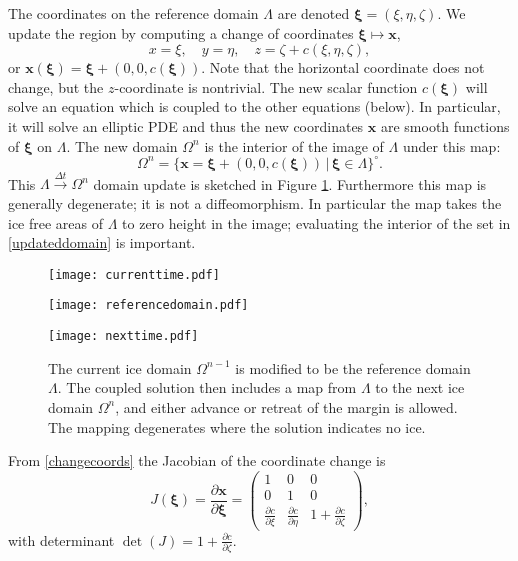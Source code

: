 \documentclass[letterpaper,final,12pt,reqno]{amsart}
\newcommand{\bx}{\mathbf{x}}
\newcommand{\bxi}{\bm{\xi}}
\begin{document}
The coordinates on the reference domain $\Lambda$ are denoted $\bxi=(\xi,\eta,\zeta)$.  We update the region by computing a change of coordinates $\bxi \mapsto \bx$,
\begin{equation}
x=\xi, \quad y=\eta, \quad z=\zeta+c(\xi,\eta,\zeta), \label{changecoords}
\end{equation}
or $\bx(\bxi) = \bxi + (0,0,c(\bxi))$.  Note that the horizontal coordinate does not change, but the $z$-coordinate is nontrivial.  The new scalar function $c(\bxi)$ will solve an equation which is coupled to the other equations (below).  In particular, it will solve an elliptic PDE and thus the new coordinates $\bx$ are smooth functions of $\bxi$ on $\Lambda$.  The new domain $\Omega^n$ is the interior of the image of $\Lambda$ under this map:
\begin{equation}
\Omega^n = \{\bx=\bxi + (0,0,c(\bxi)) \,\big|\, \bxi \in \Lambda\}^\circ. \label{updateddomain}
\end{equation}
This $\Lambda \stackrel{\Delta t}{\to} \Omega^n$ domain update is sketched in Figure \ref{fig:domainupdate}.  Furthermore this map is generally degenerate; it is not a diffeomorphism.  In particular the map takes the ice free areas of $\Lambda$ to zero height in the image; evaluating the interior of the set in \eqref{updateddomain} is important.

\begin{figure}[h]
\begin{center}
\texttt{[image: currenttime.pdf]}
\vspace{-3mm}

\texttt{[image: referencedomain.pdf]}

\texttt{[image: nexttime.pdf]}
\end{center}
\caption{The current ice domain $\Omega^{n-1}$ is modified to be the reference domain $\Lambda$.  The coupled solution then includes a map from $\Lambda$ to the next ice domain $\Omega^n$, and either advance or retreat of the margin is allowed.  The mapping degenerates where the solution indicates no ice.}
\label{fig:domainupdate}
\end{figure}

From \eqref{changecoords} the Jacobian of the coordinate change is
\begin{equation}
J(\bxi) = \frac{\partial \bx}{\partial \bm{\xi}} = \begin{pmatrix} 1 & 0 & 0 \\  0 & 1 & 0 \\ \frac{\partial c}{\partial \xi} & \frac{\partial c}{\partial \eta} & 1+\frac{\partial c}{\partial \zeta} \end{pmatrix}, \label{jacchange}
\end{equation}
with determinant $\det(J)=1+\frac{\partial c}{\partial \zeta}$.
\end{document}
